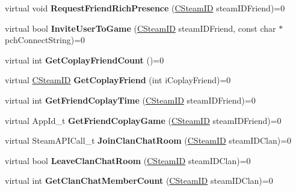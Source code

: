 \begin{DoxyCompactItemize}
virtual void {\bfseries Request\+Friend\+Rich\+Presence} (\hyperlink{class_c_steam_i_d}{C\+Steam\+ID} steam\+I\+D\+Friend)=0
\item 
\mbox{\label{class_i_steam_friends_af28a1938dd5d1460f0cf5a9755f60a86}} 
virtual bool {\bfseries Invite\+User\+To\+Game} (\hyperlink{class_c_steam_i_d}{C\+Steam\+ID} steam\+I\+D\+Friend, const char $\ast$pch\+Connect\+String)=0
\item 
\mbox{\label{class_i_steam_friends_a80597cb86daf3562602d254754a867f7}} 
virtual int {\bfseries Get\+Coplay\+Friend\+Count} ()=0
\item 
\mbox{\label{class_i_steam_friends_a896aad4f362b4d107dbf248cc9dd0fc7}} 
virtual \hyperlink{class_c_steam_i_d}{C\+Steam\+ID} {\bfseries Get\+Coplay\+Friend} (int i\+Coplay\+Friend)=0
\item 
\mbox{\label{class_i_steam_friends_a8cc2fdf1cca9a23cc2c81960cbc84f8f}} 
virtual int {\bfseries Get\+Friend\+Coplay\+Time} (\hyperlink{class_c_steam_i_d}{C\+Steam\+ID} steam\+I\+D\+Friend)=0
\item 
\mbox{\label{class_i_steam_friends_a166e14738d6123a0f6c2f6fdab67377c}} 
virtual App\+Id\+\_\+t {\bfseries Get\+Friend\+Coplay\+Game} (\hyperlink{class_c_steam_i_d}{C\+Steam\+ID} steam\+I\+D\+Friend)=0
\item 
\mbox{\label{class_i_steam_friends_a2308b85c4d82575ebcf88e0a2a37a030}} 
virtual Steam\+A\+P\+I\+Call\+\_\+t {\bfseries Join\+Clan\+Chat\+Room} (\hyperlink{class_c_steam_i_d}{C\+Steam\+ID} steam\+I\+D\+Clan)=0
\item 
\mbox{\label{class_i_steam_friends_ac3aacc8799c95d30fe1c2c95d1747365}} 
virtual bool {\bfseries Leave\+Clan\+Chat\+Room} (\hyperlink{class_c_steam_i_d}{C\+Steam\+ID} steam\+I\+D\+Clan)=0
\item 
\mbox{\label{class_i_steam_friends_a424c2a4680fab3b327523cde6895a57c}} 
virtual int {\bfseries Get\+Clan\+Chat\+Member\+Count} (\hyperlink{class_c_steam_i_d}{C\+Steam\+ID} steam\+I\+D\+Clan)=0
\item 

\end{DoxyCompactItemize}
